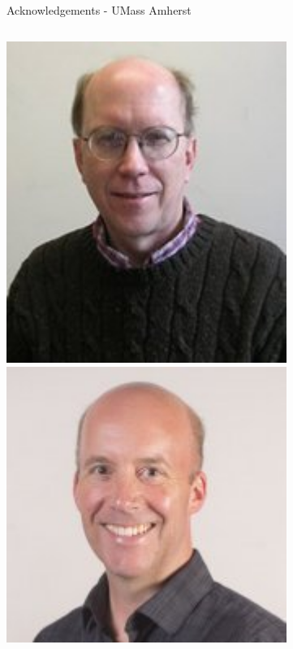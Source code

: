 \documentclass[aspectratio=169]{beamer}
\begin{document}
\begin{frame}{Acknowledgements - UMass Amherst}
\begin{columns}
            \includegraphics[width=0.99\textwidth]{people/umassprofs/miskimen.png}
            \includegraphics[width=0.99\textwidth]{people/umassprofs/dinsmore.png}

\end{columns}
\end{frame}
\end{document}
